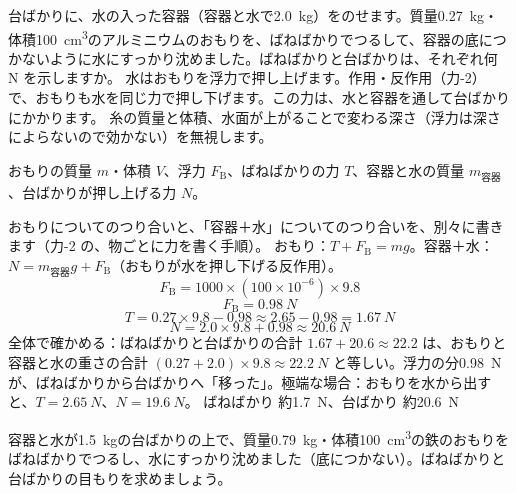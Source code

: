 \begin{phreidai}
\label{ph:力-12:ex13}台ばかりに、水の入った容器（容器と水で\qty{2.0}{kg}）をのせます。質量\qty{0.27}{kg}・体積\qty{100}{cm^3}のアルミニウムのおもりを、ばねばかりでつるして、容器の底につかないように水にすっかり沈めました。ばねばかりと台ばかりは、それぞれ何 N を示しますか。
\phbamen
水はおもりを浮力で押し上げます。作用・反作用（力-2）で、おもりも水を同じ力で押し下げます。この力は、水と容器を通して台ばかりにかかります。
\phmushi
糸の質量と体積、水面が上がることで変わる深さ（浮力は深さによらないので効かない）を無視します。
\phzu
\noindent\begin{minipage}[c]{0.40\linewidth}\centering
{}
\end{minipage}\hfill
\begin{minipage}[c]{0.57\linewidth}\raggedright
おもりの質量 $m$・体積 $V$、浮力 $F_{\mathrm{B}}$、ばねばかりの力 $T$、容器と水の質量 $m_{\text{容器}}$、台ばかりが押し上げる力 $N$。
\end{minipage}
\phriyu
おもりについてのつり合いと、「容器＋水」についてのつり合いを、別々に書きます（力-2 の、物ごとに力を書く手順）。
\phtateru
おもり：$T+F_{\mathrm{B}}=mg$。\quad 容器＋水：$N=m_{\text{容器}}g+F_{\mathrm{B}}$（おもりが水を押し下げる反作用）。
\[ F_{\mathrm{B}}=1000\times(100\times10^{-6})\times9.8 \]
\phtoku
\[ F_{\mathrm{B}}=\qty{0.98}{N} \]
\[ T=0.27\times9.8-0.98\approx2.65-0.98=\qty{1.67}{N} \]
\[ N=2.0\times9.8+0.98\approx\qty{20.6}{N} \]
\phtashikame
全体で確かめる：ばねばかりと台ばかりの合計 $1.67+20.6\approx22.2$ は、おもりと容器と水の重さの合計 $(0.27+2.0)\times9.8\approx\qty{22.2}{N}$ と等しい。浮力の分\qty{0.98}{N}が、ばねばかりから台ばかりへ「移った」。極端な場合：おもりを水から出すと、$T=\qty{2.65}{N}$、$N=\qty{19.6}{N}$。
\kotae ばねばかり 約\qty{1.7}{N}、台ばかり 約\qty{20.6}{N}
\end{phreidai}
\begin{jibun}
容器と水が\qty{1.5}{kg}の台ばかりの上で、質量\qty{0.79}{kg}・体積\qty{100}{cm^3}の鉄のおもりをばねばかりでつるし、水にすっかり沈めました（底につかない）。ばねばかりと台ばかりの目もりを求めましょう。
\end{jibun}

